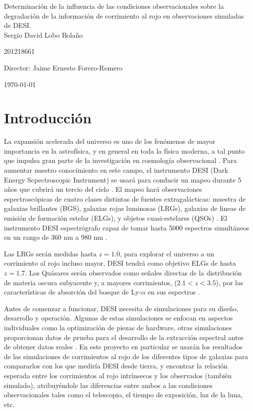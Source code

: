 \documentclass[12pt]{article}
\begin{document}
\begin{center}
\huge
Determinación de la influencia de las condiciones observacionales sobre la degradación de la informaci\'on de corrimiento al rojo en observaciones simuladas de DESI.\\
\vspace{3mm}
\Large Sergio David Lobo Bolaño

\large
201218661

\vspace{2mm}
\Large
Director: Jaime Ernesto Forero-Romero


\vspace{2mm}

\today
\end{center}


\section{Introducción}

La expansión acelerada del universo es uno de los fenómenos de mayor
importancia en la astrofísica, y en general en toda la física moderna,
a tal punto que impulsa gran parte de la investigación en cosmología
observacional \cite{Nord:2016plv}. Para aumentar nuestro conocimiento
en este campo, el instrumento DESI (Dark Energy Scpectroscopic
Instrument) se usará para conducir un mapeo durante 5 años que cubrirá
un tercio del cielo \cite{Aghamousa:2016zmz}. El mapeo hará observaciones
espectroscópicas de cuatro clases distintas de fuentes
extragalácticas:   muestra de galaxias brillantes (BGS), galaxias rojas luminosas (LRGs), galaxias de lineas de emisión de formación estelar (ELGs), y objetos cuasi-estelares (QSOs) \cite{Aghamousa:2016zmz}. El instrumento DESI espectrógrafo capaz de tomar hasta 5000 espectros simultáneos en un rango de 360 nm a 980 nm \cite{Aghamousa:2016sne}. 

Las LRGs serán medidas hasta $z = 1.0$, para explorar el universo a un corrimiento al rojo incluso mayor, DESI tendrá como objetivo ELGs de hasta $z = 1.7$. Los Quásares serán observados como señales directas de la distribución de materia oscura subyacente y, a mayores corrimientos, ($2.1<z<3.5$), por las características de absorción del bosque de Ly-$\alpha$ en sus espectros \cite{Aghamousa:2016zmz}. 

Antes de comenzar a funcionar, DESI necesita de simulaciones para su
diseño, desarrollo y operación. Algunas de estas simulaciones se
enfocan en aspectos individuales como la optimización de piezas de
hardware, otras simulaciones proporcionan datos de prueba para el
desarrollo de la extracción espectral antes de obtener datos reales
\cite{Aghamousa:2016sne}. En este proyecto en particular se usarán los
resultados de las simulaciones de corrimientos al rojo de los
diferentes tipos de galaxias para compararlos con los que mediría DESI
desde tierra, y encontrar la relación esperada entre los corrimientos
al rojo intr\'insecos y los observados (también simulado),
atribuyéndole las diferencias entre  ambos a las condiciones
observacionales tales como el telescopio, el tiempo de exposición, luz
de la luna, etc.   
\end{document}
